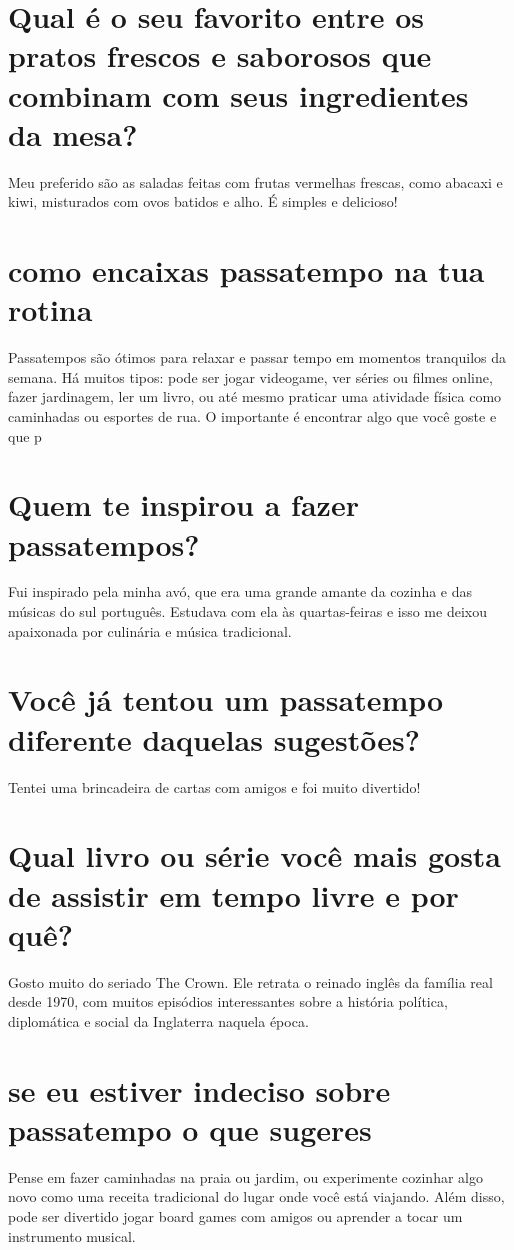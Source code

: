 \documentclass[11pt,a4paper]{article}
\begin{document}
\section{Qual é o seu favorito entre os pratos frescos e saborosos que combinam com seus ingredientes da mesa?}
Meu preferido são as saladas feitas com frutas vermelhas frescas, como abacaxi e kiwi, misturados com ovos batidos e alho. É simples e delicioso!

\section{como encaixas passatempo na tua rotina}
Passatempos são ótimos para relaxar e passar tempo em momentos tranquilos da semana. Há muitos tipos: pode ser jogar videogame, ver séries ou filmes online, fazer jardinagem, ler um livro, ou até mesmo praticar uma atividade física como caminhadas ou esportes de rua. O importante é encontrar algo que você goste e que p

\section{Quem te inspirou a fazer passatempos?}
Fui inspirado pela minha avó, que era uma grande amante da cozinha e das músicas do sul português. Estudava com ela às quartas-feiras e isso me deixou apaixonada por culinária e música tradicional.

\section{Você já tentou um passatempo diferente daquelas sugestões?}
Tentei uma brincadeira de cartas com amigos e foi muito divertido!

\section{Qual livro ou série você mais gosta de assistir em tempo livre e por quê?}
Gosto muito do seriado The Crown. Ele retrata o reinado inglês da família real desde 1970, com muitos episódios interessantes sobre a história política, diplomática e social da Inglaterra naquela época.

\section{se eu estiver indeciso sobre passatempo o que sugeres}
Pense em fazer caminhadas na praia ou jardim, ou experimente cozinhar algo novo como uma receita tradicional do lugar onde você está viajando. Além disso, pode ser divertido jogar board games com amigos ou aprender a tocar um instrumento musical.
\end{document}
